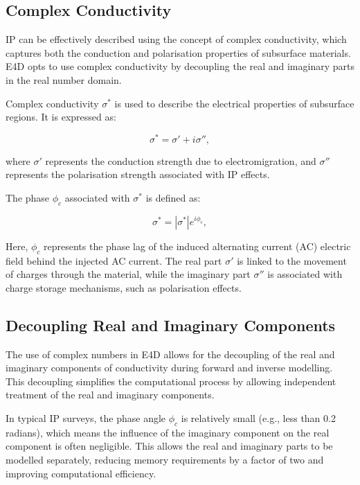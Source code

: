 \documentclass[a4paper,12pt]{article}
\begin{document}
\subsection{Complex Conductivity}

IP can be effectively described using the concept of complex conductivity, which captures both the conduction and polarisation properties of subsurface materials. E4D opts to use complex conductivity by decoupling the real and imaginary parts in the real number domain.

Complex conductivity \( \sigma^* \) is used to describe the electrical properties of subsurface regions. It is expressed as:

\begin{equation}
\sigma^* = \sigma' + i\sigma'',
\end{equation}

where \( \sigma' \) represents the conduction strength due to electromigration, and \( \sigma'' \) represents the polarisation strength associated with IP effects.

The phase \( \phi_c \) associated with \( \sigma^* \) is defined as:

\begin{equation}
\sigma^* = |\sigma^*| e^{i\phi_c},
\end{equation}

Here, \( \phi_c \) represents the phase lag of the induced alternating current (AC) electric field behind the injected AC current. The real part \( \sigma' \) is linked to the movement of charges through the material, while the imaginary part \( \sigma'' \) is associated with charge storage mechanisms, such as polarisation effects.

\subsection{Decoupling Real and Imaginary Components}

The use of complex numbers in E4D allows for the decoupling of the real and imaginary components of conductivity during forward and inverse modelling. This decoupling simplifies the computational process by allowing independent treatment of the real and imaginary components.

In typical IP surveys, the phase angle \( \phi_c \) is relatively small (e.g., less than 0.2 radians), which means the influence of the imaginary component on the real component is often negligible. This allows the real and imaginary parts to be modelled separately, reducing memory requirements by a factor of two and improving computational efficiency.
\end{document}
